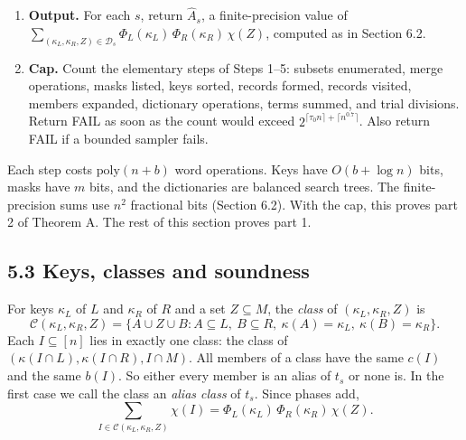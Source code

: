 \documentclass[10pt,a4paper]{article}
\begin{document}
\begin{enumerate}
\begin{itemize}
integer $c(\kappa_R) + c_\lambda$. For each left record $(\kappa_L, X)$, find the group with
$b(\kappa_R) + b_\lambda = T^F - b(\kappa_L) - b^F(X)$. In it, find by two binary searches the interval of records
with $c(\kappa_R) + c_\lambda = t^F - c(\kappa_L) - c^F(X)$. Skip that interval, and \emph{visit} every other record of
the group.
\item (g) \emph{Expansion:} for each visited $(\kappa_R, \lambda)$ and each member $Y$ of $\lambda$, test $X \cap Y = \varnothing$.
If the test passes, put $Z = (X\cup Y)\triangle F$, and insert the key $(\kappa_L, \kappa_R, Z)$ into the
dictionary $\mathcal D_s$ unless it is there.
\end{itemize}
\item \textbf{Output.} For each $s$, return $\hat A_s$, a finite-precision value of
$\sum_{(\kappa_L, \kappa_R, Z)\in\mathcal D_s}\Phi_L(\kappa_L)\,\Phi_R(\kappa_R)\,\chi(Z)$, computed as in Section 6.2.
\item \textbf{Cap.} Count the elementary steps of Steps 1--5: subsets enumerated, merge operations, masks listed, keys sorted,
records formed, records visited, members expanded, dictionary operations, terms summed, and trial divisions. Return
FAIL as soon as the count would exceed $2^{\lceil\tau_0 n\rceil + \lceil n^{0.7}\rceil}$. Also return FAIL if a
bounded sampler fails.
\end{enumerate}

Each step costs $\mathrm{poly}(n+b)$ word operations. Keys have $O(b + \log n)$ bits, masks have $m$ bits, and the
dictionaries are balanced search trees. The finite-precision sums use $n^2$ fractional bits (Section 6.2). With the
cap, this proves part 2 of Theorem A. The rest of this section proves part 1.

\subsection*{5.3 Keys, classes and soundness}

For keys $\kappa_L$ of $L$ and $\kappa_R$ of $R$ and a set $Z \subseteq M$, the \emph{class} of $(\kappa_L, \kappa_R, Z)$ is
\[\mathcal C(\kappa_L, \kappa_R, Z) = \{A\cup Z\cup B : A \subseteq L,\ B \subseteq R,\ \kappa(A) = \kappa_L,\ \kappa(B) = \kappa_R\}.\]
Each $I \subseteq [n]$ lies in exactly one class: the class of $(\kappa(I\cap L), \kappa(I\cap R), I\cap M)$. All
members of a class have the same $c(I)$ and the same $b(I)$. So either every member is an alias of $t_s$ or none is.
In the first case we call the class an \emph{alias class} of $t_s$. Since phases add,
\[\sum_{I \in \mathcal C(\kappa_L, \kappa_R, Z)}\chi(I) = \Phi_L(\kappa_L)\,\Phi_R(\kappa_R)\,\chi(Z). \tag{5.2}\]
\end{document}
